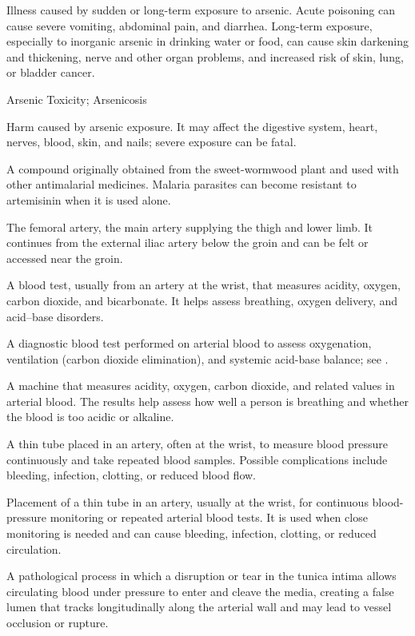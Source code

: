  Illness caused by sudden or long-term exposure to arsenic. Acute poisoning can cause severe vomiting, abdominal pain, and diarrhea. Long-term exposure, especially to inorganic arsenic in drinking water or food, can cause skin darkening and thickening, nerve and other organ problems, and increased risk of skin, lung, or bladder cancer.

\synonyms
Arsenic Toxicity; Arsenicosis

 Harm caused by arsenic exposure. It may affect the digestive system, heart, nerves, blood, skin, and nails; severe exposure can be fatal.

 A compound originally obtained from the sweet-wormwood plant and used with other antimalarial medicines. Malaria parasites can become resistant to artemisinin when it is used alone.

 The femoral artery, the main artery supplying the thigh and lower limb. It continues from the external iliac artery below the groin and can be felt or accessed near the groin.

 A blood test, usually from an artery at the wrist, that measures acidity, oxygen, carbon dioxide, and bicarbonate. It helps assess breathing, oxygen delivery, and acid–base disorders.

 A diagnostic blood test performed on arterial blood to assess oxygenation, ventilation (carbon dioxide elimination), and systemic acid-base balance; see .

 A machine that measures acidity, oxygen, carbon dioxide, and related values in arterial blood. The results help assess how well a person is breathing and whether the blood is too acidic or alkaline.

 A thin tube placed in an artery, often at the wrist, to measure blood pressure continuously and take repeated blood samples. Possible complications include bleeding, infection, clotting, or reduced blood flow.

 Placement of a thin tube in an artery, usually at the wrist, for continuous blood-pressure monitoring or repeated arterial blood tests. It is used when close monitoring is needed and can cause bleeding, infection, clotting, or reduced circulation.

 A pathological process in which a disruption or tear in the tunica intima allows circulating blood under pressure to enter and cleave the media, creating a false lumen that tracks longitudinally along the arterial wall and may lead to vessel occlusion or rupture.


